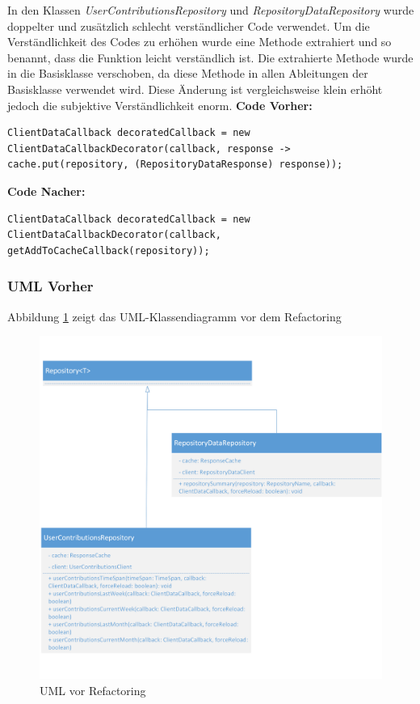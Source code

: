 \documentclass[12pt]{article}
\begin{document}
In den Klassen \textit{UserContributionsRepository} und \textit{RepositoryDataRepository} wurde doppelter und zusätzlich schlecht verständlicher Code verwendet. Um die Verständlichkeit des Codes zu erhöhen wurde eine Methode extrahiert und so benannt, dass die Funktion leicht verständlich ist. Die extrahierte Methode wurde in die Basisklasse verschoben, da diese Methode in allen Ableitungen der Basisklasse verwendet wird. Diese Änderung ist vergleichsweise klein erhöht jedoch die subjektive Verständlichkeit enorm.
\newline
\newline
\textbf{Code Vorher:}
\begin{lstlisting}
ClientDataCallback decoratedCallback = new ClientDataCallbackDecorator(callback, response ->  cache.put(repository, (RepositoryDataResponse) response));
\end{lstlisting}
\textbf{Code Nacher:} 
\begin{lstlisting}
ClientDataCallback decoratedCallback = new ClientDataCallbackDecorator(callback, getAddToCacheCallback(repository));
\end{lstlisting}

\newpage
\subsubsection{UML Vorher}
Abbildung \ref{fig:ExtractMethod_Refactoring_Before} zeigt das UML-Klassendiagramm vor dem Refactoring
\begin{figure}[h]
  \includegraphics{refactoring_extract_method_repository_before.png}
  \centering
  \caption{UML vor Refactoring}
  \label{fig:ExtractMethod_Refactoring_Before}
\end{figure}
\end{document}
